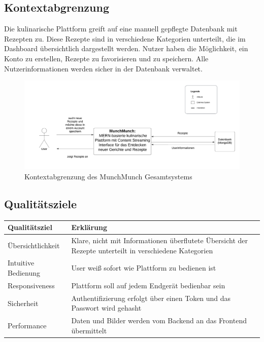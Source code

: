 \documentclass[conference,a4paper,flushend]{cs-techrep}
\begin{document}
\subsection{Kontextabgrenzung}
Die kulinarische Plattform greift auf eine manuell gepflegte Datenbank mit Rezepten zu. Diese Rezepte sind in verschiedene Kategorien unterteilt, die im Dashboard übersichtlich dargestellt werden. Nutzer haben die Möglichkeit, ein Konto zu erstellen, Rezepte zu favorisieren und zu speichern. Alle Nutzerinformationen werden sicher in der Datenbank verwaltet.
\begin{figure}[h]
    \centering
    \includegraphics[width=1\linewidth]{Konzeptabgrenzung_Diagramm.png}
    \caption{Kontextabgrenzung des MunchMunch Gesamtsystems}
    \label{fig:enter-label}
\end{figure}

\subsection{Qualitätsziele}
\begin{tabular}{|p{3.5cm}|p{3.5cm}|}
\hline 
\textbf{Qualitätsziel} & \textbf{Erklärung} \\ %
\hline %
Übersichtlichkeit & Klare, nicht mit Informationen überflutete Übersicht der Rezepte unterteilt in verschiedene Kategorien \\ %
\hline %
Intuitive Bedienung & User weiß sofort wie Plattform zu bedienen ist \\ %
\hline %
Responsiveness  & Plattform soll auf jedem Endgerät bedienbar sein \\ %
\hline %
Sicherheit  & Authentifizierung erfolgt über einen Token und das Passwort wird gehasht \\ %
\hline %
Performance  & Daten und Bilder werden vom Backend an das Frontend übermittelt \\ %
\hline %
\end{tabular}
\end{document}
